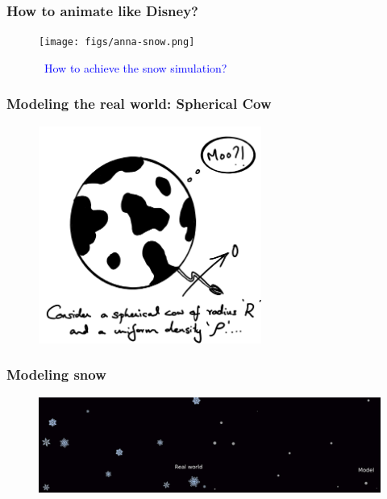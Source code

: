 \documentclass[notes]{beamer}
\begin{document}
\begin{frame}
	\frametitle{How to animate like Disney?}
	\begin{figure}[ht]
		\centering
		\texttt{[image: figs/anna-snow.png]}
		\caption*{\textcolor{blue}{\faCommentsO ~How to achieve the snow simulation?}}
	\end{figure}
\end{frame}

\begin{frame}
	\frametitle{Modeling the real world: Spherical Cow}
	\begin{figure}[ht]
		\centering
		\includegraphics[width=0.65\textwidth]{figs/spherical-cow.png}
	\end{figure}
\end{frame}

\begin{frame}
	\frametitle{Modeling snow}
	\begin{figure}[ht]
		\centering
		\includegraphics[width=\textwidth]{figs/snow-model.png}
	\end{figure}
\end{frame}
\end{document}
